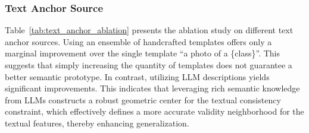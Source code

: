 \documentclass{article}
\theoremstyle{plain}
\theoremstyle{definition}
\theoremstyle{remark}
\begin{document}
	\subsubsection{Text Anchor Source}
	\begin{table}[h]
		\caption{Ablation study on different text anchor sources. While handcrafted templates offer a marginal improvement over "a photo of a \{class\}" template, LLM descriptions provide rich semantic knowledge, significantly boosting generalization on novel classes.}
		\label{tab:text_anchor_ablation}
		\centering
	\end{table}
	Table~\ref{tab:text_anchor_ablation} presents the ablation study on different text anchor sources. Using an ensemble of handcrafted templates offers only a marginal improvement over the single template ``a photo of a \{class\}''. This suggests that simply increasing the quantity of templates does not guarantee a better semantic prototype. In contrast, utilizing LLM descriptions yields significant improvements. This indicates that leveraging rich semantic knowledge from LLMs constructs a robust geometric center for the textual consistency constraint, which effectively defines a more accurate validity neighborhood for the textual features, thereby enhancing generalization.
\end{document}
